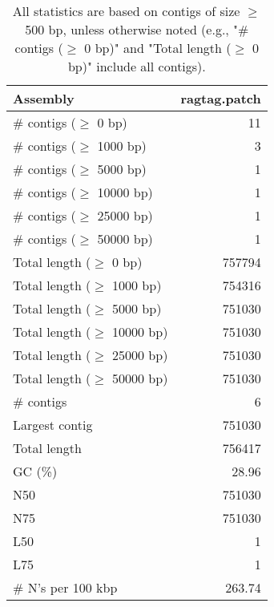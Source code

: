 \documentclass[12pt,a4paper]{article}
\begin{document}
\begin{table}[ht]
\begin{center}
\caption{All statistics are based on contigs of size $\geq$ 500 bp, unless otherwise noted (e.g., "\# contigs ($\geq$ 0 bp)" and "Total length ($\geq$ 0 bp)" include all contigs).}
\begin{tabular}{|l*{1}{|r}|}
\hline
Assembly & ragtag.patch \\ \hline
\# contigs ($\geq$ 0 bp) & 11 \\ \hline
\# contigs ($\geq$ 1000 bp) & 3 \\ \hline
\# contigs ($\geq$ 5000 bp) & 1 \\ \hline
\# contigs ($\geq$ 10000 bp) & 1 \\ \hline
\# contigs ($\geq$ 25000 bp) & 1 \\ \hline
\# contigs ($\geq$ 50000 bp) & 1 \\ \hline
Total length ($\geq$ 0 bp) & 757794 \\ \hline
Total length ($\geq$ 1000 bp) & 754316 \\ \hline
Total length ($\geq$ 5000 bp) & 751030 \\ \hline
Total length ($\geq$ 10000 bp) & 751030 \\ \hline
Total length ($\geq$ 25000 bp) & 751030 \\ \hline
Total length ($\geq$ 50000 bp) & 751030 \\ \hline
\# contigs & 6 \\ \hline
Largest contig & 751030 \\ \hline
Total length & 756417 \\ \hline
GC (\%) & 28.96 \\ \hline
N50 & 751030 \\ \hline
N75 & 751030 \\ \hline
L50 & 1 \\ \hline
L75 & 1 \\ \hline
\# N's per 100 kbp & 263.74 \\ \hline
\end{tabular}
\end{center}
\end{table}
\end{document}
